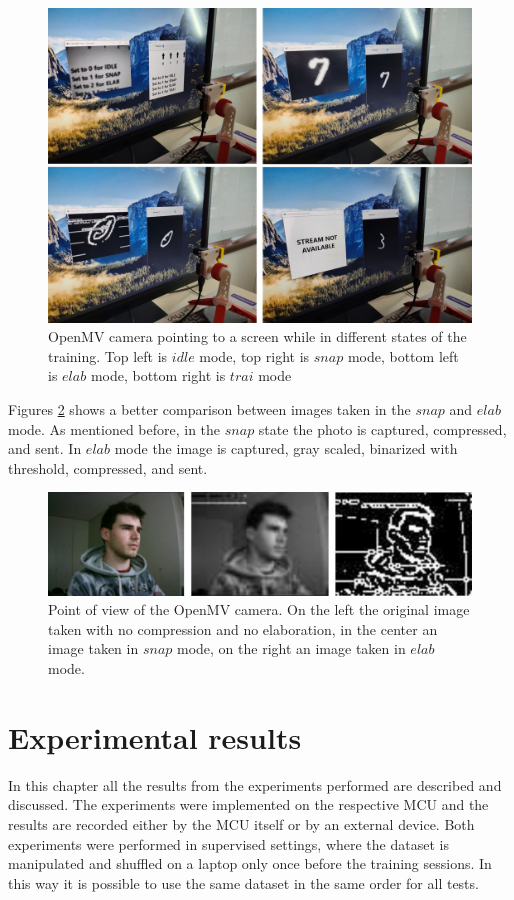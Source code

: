 \documentclass[12pt]{report}
\newcommand\blankpage{%
    \null
    \thispagestyle{empty}%
    \addtocounter{page}{0}%
    \newpage}
\begin{document}
\begin{figure}[h!]
    \centering
    \includegraphics[width=130mm]{Figures/Chapter4/openmv_training.jpg} 
    \caption{OpenMV camera pointing to a screen while in different states of the training. Top left is $idle$ mode, top right is $snap$ mode, bottom left is $elab$ mode, bottom right is $trai$ mode}
    \label{fig:openmv_training}    
\end{figure}

Figures \ref{fig:openmv_pov} shows a better comparison between images taken in the $snap$ and $elab$ mode. As mentioned before, in the $snap$ state the photo is captured, compressed, and sent. In $elab$ mode the image is captured, gray scaled, binarized with threshold, compressed, and sent.

\begin{figure}[h!]
    \centering
    \includegraphics[width=140mm]{Figures/Chapter4/openmv_pov.jpg} 
    \caption{Point of view of the OpenMV camera. On the left the original image taken with no compression and no elaboration, in the center an image taken in $snap$ mode, on the right an image taken in $elab$ mode.}
    \label{fig:openmv_pov}    
\end{figure}

\afterpage{\blankpage}
\chapter{Experimental results} 
In this chapter all the results from the experiments performed are described and discussed. The experiments were implemented on the respective MCU and the results are recorded either by the MCU itself or by an external device. Both experiments were performed in supervised settings, where the dataset is manipulated and shuffled on a laptop only once before the training sessions. In this way it is possible to use the same dataset in the same order for all tests.
\end{document}
